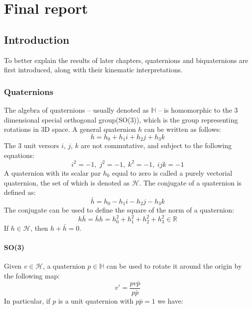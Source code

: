 \chapter{Final report}

\section{Introduction}
To better explain the results of later chapters, quaternions and biquaternions are first introduced, along with their kinematic interpretations.



\subsection{Quaternions}
The algebra of quaternions -- usually denoted as $\mathbb{H}$ -- is homomorphic to the 3 dimensional special orthogonal group(SO(3)), which is the group representing rotations in 3D space. A general quaternion $h$ can be written as follows:
\begin{equation}
    h = h_0 + h_1i +h_2j + h_3k
\end{equation}
The 3 unit versors $i$,  $j$, $k$ are not commutative, and subject to the following equations:
\begin{equation}
       i^{2} = -1,\;
       j^{2} = -1,\;
       k^{2} = -1,\;
       ijk = -1
\end{equation}
A quaternion with its scalar par $h_0$ equal to zero is called a purely vectorial quaternion, the set of which is denoted as $\mathcal{H}$.  The conjugate of a quaternion is defined as:
\begin{equation}
    \bar{h} = h_0 - h_1i - h_2j - h_3k
\end{equation}
The conjugate can be used to define the square of the norm of a quaternion:
\begin{equation}
    h\bar{h} = \bar{h}h = h_0^{2} + h_1^{2}+h_2^{2} + h_3^{2} \in \mathbb{R}
\end{equation}
If $h \in \mathcal{H}$, then $h + \bar{h} = 0$.
\clearpage
\subsubsection{SO(3)}
Given $v \in \mathcal{H}$, a quaternion $p \in \mathbb{H}$ can be used to rotate it around the origin by the following map:
\begin{equation}
    v' = \frac{pv\bar{p}}{p\bar{p}}
\end{equation}
In particular, if $p$ is a unit quaternion with $p\bar{p} = 1$ we have:

